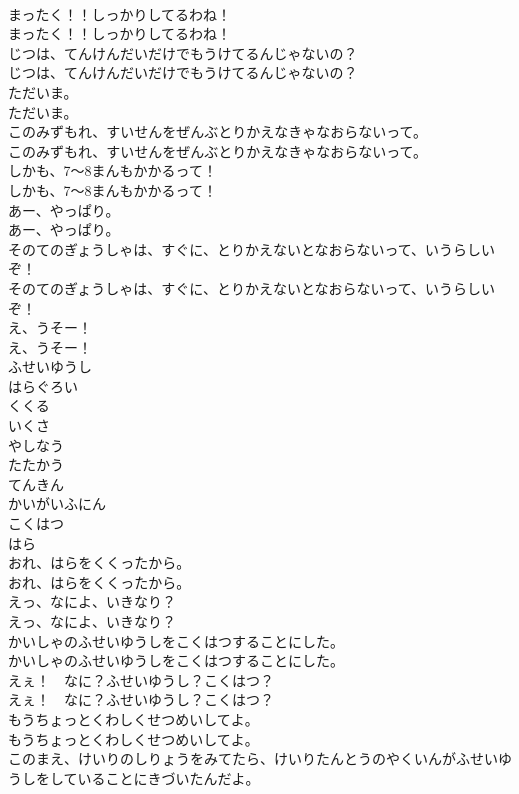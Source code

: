 \documentclass[8pt]{extreport}
\begin{document}
\begin{CJK}{UTF8}{min}
\\	まったく！！しっかりしてるわね！
\\	まったく！！しっかりしてるわね！
\\	じつは、てんけんだいだけでもうけてるんじゃないの？
\\	じつは、てんけんだいだけでもうけてるんじゃないの？
\\	ただいま。
\\	ただいま。
\\	このみずもれ、すいせんをぜんぶとりかえなきゃなおらないって。
\\	このみずもれ、すいせんをぜんぶとりかえなきゃなおらないって。
\\	しかも、7～8まんもかかるって！
\\	しかも、7～8まんもかかるって！
\\	あー、やっぱり。
\\	あー、やっぱり。
\\	そのてのぎょうしゃは、すぐに、とりかえないとなおらないって、いうらしいぞ！
\\	そのてのぎょうしゃは、すぐに、とりかえないとなおらないって、いうらしいぞ！
\\	え、うそー！
\\	え、うそー！
\\	ふせいゆうし
\\	はらぐろい
\\	くくる
\\	いくさ
\\	やしなう
\\	たたかう
\\	てんきん
\\	かいがいふにん
\\	こくはつ
\\	はら
\\	おれ、はらをくくったから。
\\	おれ、はらをくくったから。
\\	えっ、なによ、いきなり？
\\	えっ、なによ、いきなり？
\\	かいしゃのふせいゆうしをこくはつすることにした。
\\	かいしゃのふせいゆうしをこくはつすることにした。
\\	えぇ！　なに？ふせいゆうし？こくはつ？　
\\	えぇ！　なに？ふせいゆうし？こくはつ？　
\\	もうちょっとくわしくせつめいしてよ。
\\	もうちょっとくわしくせつめいしてよ。
\\	このまえ、けいりのしりょうをみてたら、けいりたんとうのやくいんがふせいゆうしをしていることにきづいたんだよ。

\end{CJK}
\end{document}
